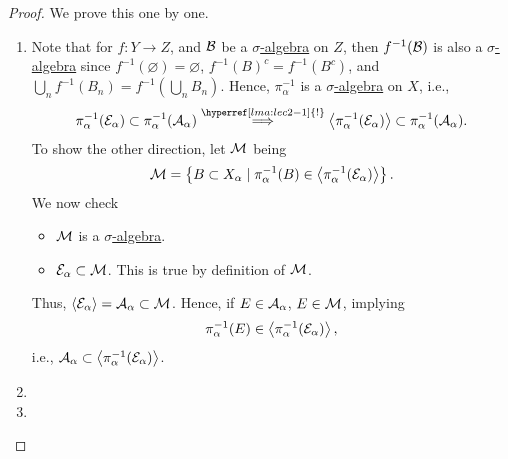 \begin{proof}
	We prove this one by one.
	\begin{enumerate}[(1)]
		\item Note that for \(f\colon Y\to Z\), and \(\mathcal{\MakeUppercase{b}} \) be a \hyperref[def:sigma-algebra]{\(\sigma\)-algebra} on \(Z\), then
		      \(f^{-1} (\mathcal{\MakeUppercase{b}} )\) is also a \hyperref[def:sigma-algebra]{\(\sigma\)-algebra} since
		      \(f^{-1} (\varnothing ) = \varnothing\), \(f^{-1} (B)^{c} = f^{-1} (B^{c} )\), and \(\bigcup_{n} f^{-1} (B_{n}) = f^{-1} (\bigcup_{n}B_{n})\).
		      Hence, \(\pi ^{-1}_\alpha \) is a \hyperref[def:sigma-algebra]{\(\sigma\)-algebra} on \(X\), i.e.,
		      \[
			      \pi _\alpha ^{-1} (\mathcal{\MakeUppercase{e}} _\alpha )\subset \pi _\alpha ^{-1} (\mathcal{\MakeUppercase{a}} _\alpha )\overset{\hyperref[lma:lec2-1]{!}}{\implies} \left< \pi ^{-1} _\alpha (\mathcal{\MakeUppercase{e}} _\alpha ) \right> \subset \pi _\alpha ^{-1} (\mathcal{\MakeUppercase{a}} _\alpha ).
		      \]
		      To show the other direction, let \(\mathcal{\MakeUppercase{m}} \) being
		      \[
			      \mathcal{\MakeUppercase{m}} = \left\{B\subset X_\alpha  \mid \pi _\alpha ^{-1} (B)\in \left< \pi _\alpha ^{-1} (\mathcal{\MakeUppercase{e}} _\alpha ) \right> \right\}.
		      \]
		      We now check
		      \begin{itemize}
			      \item \(\mathcal{\MakeUppercase{m}} \) is a \hyperref[def:sigma-algebra]{\(\sigma\)-algebra}. 
			      \item \(\mathcal{\MakeUppercase{e}} _\alpha \subset \mathcal{\MakeUppercase{m}}\). This is true by definition of \(\mathcal{\MakeUppercase{m}} \).
		      \end{itemize}
		      Thus, \(\left< \mathcal{\MakeUppercase{e}} _\alpha \right> = \mathcal{\MakeUppercase{a}} _\alpha \subset \mathcal{\MakeUppercase{m}} \). Hence,
		      if \(E\in \mathcal{\MakeUppercase{a}} _\alpha \), \(E\in \mathcal{\MakeUppercase{m}} \), implying
		      \[
			      \pi _\alpha ^{-1} (E)\in \left< \pi _\alpha ^{-1} (\mathcal{\MakeUppercase{e}} _\alpha ) \right>,
		      \]
		      i.e., \(\mathcal{\MakeUppercase{a}} _\alpha \subset \left< \pi_\alpha ^{-1} (\mathcal{\MakeUppercase{e}} _\alpha ) \right> \).
		\item {}
		\item {}
	\end{enumerate}
\end{proof}

